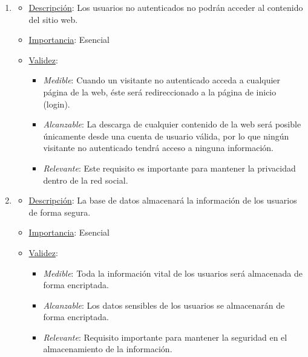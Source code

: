 \begin{enumerate}

\item %
  \begin{itemize}
  \item \underline{Descripción}: Los usuarios no autenticados no podrán acceder al contenido del sitio web.
  \item \underline{Importancia}: Esencial
  \item \underline{Validez}:
    \begin{itemize}
    \item \textit{Medible}: Cuando un visitante no autenticado acceda a cualquier página de la web, éste será redireccionado a la página de inicio (login).
    \item \textit{Alcanzable}: La descarga de cualquier contenido de la web será posible únicamente desde una cuenta de usuario válida, por lo que ningún visitante no autenticado tendrá acceso a ninguna información.
    \item \textit{Relevante}: Este requisito es importante para mantener la privacidad dentro de la red social.
    \end{itemize}
  \end{itemize}

\item %
  \begin{itemize}
  \item \underline{Descripción}: La base de datos almacenará la información de los usuarios de forma segura.
  \item \underline{Importancia}: Esencial
  \item \underline{Validez}:
    \begin{itemize}
    \item \textit{Medible}: Toda la información vital de los usuarios será almacenada de forma encriptada.
    \item \textit{Alcanzable}: Los datos sensibles de los usuarios se almacenarán de forma encriptada.
    \item \textit{Relevante}: Requisito importante para mantener la seguridad en el almacenamiento de la información.
    \end{itemize}
  \end{itemize}


\end{enumerate}
